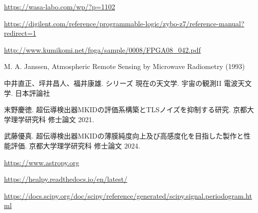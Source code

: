 \begin{thebibliography}{99}
\href{https://wasa-labo.com/wp/?p=1102}{https://wasa-labo.com/wp/?p=1102}

\href{https://digilent.com/reference/programmable-logic/zybo-z7/reference-manual?redirect=1}{https://digilent.com/reference/programmable-logic/zybo-z7/reference-manual?redirect=1}


\href{http://www.kumikomi.net/fpga/sample/0008/FPGA08\_042.pdf}{http://www.kumikomi.net/fpga/sample/0008/FPGA08\_042.pdf}


M. A. Janssen, Atmospheric Remote Sensing by Microwave Radiometry (1993)

中井直正、坪井昌人、福井康雄. シリーズ  現在の天文学. 宇宙の観測I\hspace{-1.2pt}I  電波天文学. 日本評論社

末野慶徳. 超伝導検出器MKIDの評価系構築とTLSノイズを抑制する研究. 京都大学理学研究科 修士論文 2021.

武藤優真. 超伝導検出器MKIDの薄膜純度向上及び高感度化を目指した製作と性能評価. 京都大学理学研究科 修士論文 2024.

\href{https://www.astropy.org}{https://www.astropy.org}

\href{https://healpy.readthedocs.io/en/latest/}{https://healpy.readthedocs.io/en/latest/}

\href{https://docs.scipy.org/doc/scipy/reference/generated/scipy.signal.periodogram.html}{https://docs.scipy.org/doc/scipy/reference/generated/scipy.signal.periodogram.html}


\end{thebibliography}
